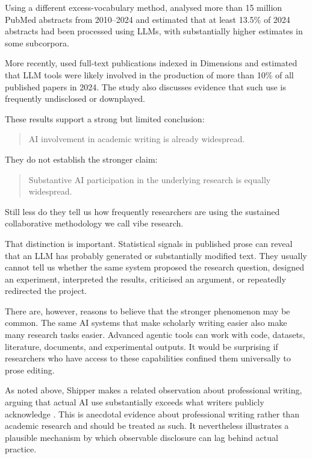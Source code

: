 Using a different excess-vocabulary method, \citet{kobakEtAl2024biomedical} analysed more than 15 million PubMed abstracts from 2010--2024 and estimated that at least 13.5\% of 2024 abstracts had been processed using LLMs, with substantially higher estimates in some subcorpora.

More recently, \citet{gray2025prevalence} used full-text publications indexed in Dimensions and estimated that LLM tools were likely involved in the production of more than 10\% of all published papers in 2024. The study also discusses evidence that such use is frequently undisclosed or downplayed.

These results support a strong but limited conclusion:

\begin{quote}
AI involvement in academic writing is already widespread.
\end{quote}

They do not establish the stronger claim:

\begin{quote}
Substantive AI participation in the underlying research is equally widespread.
\end{quote}

Still less do they tell us how frequently researchers are using the sustained collaborative methodology we call vibe research.

That distinction is important. Statistical signals in published prose can reveal that an LLM has probably generated or substantially modified text. They usually cannot tell us whether the same system proposed the research question, designed an experiment, interpreted the results, criticised an argument, or repeatedly redirected the project.

There are, however, reasons to believe that the stronger phenomenon may be common. The same AI systems that make scholarly writing easier also make many research tasks easier. Advanced agentic tools can work with code, datasets, literature, documents, and experimental outputs. It would be surprising if researchers who have access to these capabilities confined them universally to prose editing.

As noted above, Shipper makes a related observation about professional writing, arguing that actual AI use substantially exceeds what writers publicly acknowledge \citep{newton2026editorclone}. This is anecdotal evidence about professional writing rather than academic research and should be treated as such. It nevertheless illustrates a plausible mechanism by which observable disclosure can lag behind actual practice.

